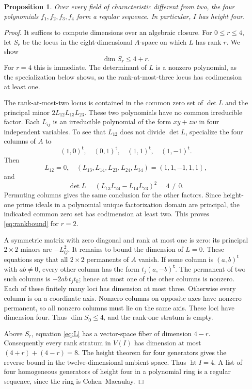 \documentclass[11pt]{article}
\newtheorem{proposition}[theorem]{Proposition}
\theoremstyle{remark}\newtheorem{remark}[theorem]{Remark}
\DeclareMathOperator{\htop}{ht}
\numberwithin{equation}{section}
\begin{document}
\begin{proposition}\label{prop:ci}
Over every field of characteristic different from two, the four
polynomials $f_1,f_2,f_3,f_4$ form a regular sequence. In particular,
$I$ has height four.
\end{proposition}
\begin{proof}
It suffices to compute dimensions over an algebraic closure.
For $0\le r\le4$, let $S_r$ be the locus in the eight-dimensional
$A$-space on which $L$ has rank $r$. We show
\begin{equation}\label{eq:rankbound}
 \dim S_r\le 4+r.
\end{equation}
For $r=4$ this is immediate. The determinant of $L$ is a nonzero
polynomial, as the specialization below shows, so the rank-at-most-three
locus has codimension at least one.

The rank-at-most-two locus is contained in the common zero set of
$\det L$ and the principal minor $2L_{12}L_{13}L_{23}$. These two
polynomials have no common irreducible factor. Each $L_{ij}$ is an
irreducible polynomial of the form $xy+zw$ in four independent
variables. To see that $L_{12}$ does not divide $\det L$, specialize
the four columns of $A$ to
\[
 (1,0)^{\mathsf t},\quad (0,1)^{\mathsf t},\quad
 (1,1)^{\mathsf t},\quad (1,-1)^{\mathsf t}.
\]
Then
\[
 L_{12}=0,\quad(L_{13},L_{14},L_{23},L_{24},L_{34})=(1,1,-1,1,1),
\]
and
\[
 \det L=(L_{13}L_{24}-L_{14}L_{23})^2=4\ne0.
\]
Permuting columns gives the same conclusion for the other factors.
Since height-one prime ideals in a polynomial unique factorization
domain are principal, the indicated common zero set has codimension
at least two. This proves \eqref{eq:rankbound} for $r=2$.

A symmetric matrix with zero diagonal and rank at most one is zero:
its principal $2\times2$ minors are $-L_{ij}^2$. It remains to bound
the dimension of $L=0$. These equations say that all $2\times2$
permanents of $A$ vanish. If some column is $(a,b)^{\mathsf t}$ with
$ab\ne0$, every other column has the form $t_j(a,-b)^{\mathsf t}$.
The permanent of two such columns is $-2ab\,t_jt_k$; hence at most one
of the other columns is nonzero. Each of these finitely many loci has
dimension at most three. Otherwise every column is on a coordinate
axis. Nonzero columns on opposite axes have nonzero permanent, so all
nonzero columns must lie on the same axis. These loci have dimension
four. Thus $\dim S_0\le4$, and the rank-one stratum is empty.

Above $S_r$, equation \eqref{eq:L} has a vector-space fiber of
dimension $4-r$. Consequently every rank stratum in $V(I)$ has
dimension at most $(4+r)+(4-r)=8$. The height theorem for four
generators gives the reverse bound in the twelve-dimensional ambient
space. Thus $\htop I=4$. A list of four homogeneous generators of
height four in a polynomial ring is a regular sequence, since the
ring is Cohen--Macaulay.
\end{proof}
\end{document}
